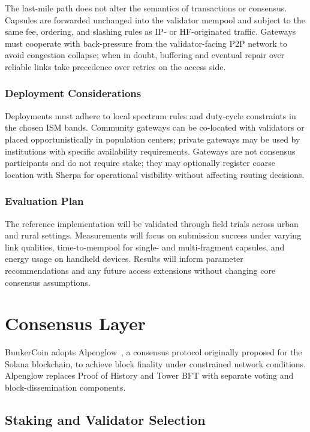 \documentclass{article}
\begin{document}
The last-mile path does not alter the semantics of transactions or consensus. Capsules are forwarded unchanged into the validator mempool and subject to the same fee, ordering, and slashing rules as IP- or HF-originated traffic. Gateways must cooperate with back-pressure from the validator-facing P2P network to avoid congestion collapse; when in doubt, buffering and eventual repair over reliable links take precedence over retries on the access side.

\subsubsection{Deployment Considerations}

Deployments must adhere to local spectrum rules and duty-cycle constraints in the chosen ISM bands. Community gateways can be co-located with validators or placed opportunistically in population centers; private gateways may be used by institutions with specific availability requirements. Gateways are not consensus participants and do not require stake; they may optionally register coarse location with Sherpa for operational visibility without affecting routing decisions.

\subsubsection{Evaluation Plan}

The reference implementation will be validated through field trials across urban and rural settings. Measurements will focus on submission success under varying link qualities, time-to-mempool for single- and multi-fragment capsules, and energy usage on handheld devices. Results will inform parameter recommendations and any future access extensions without changing core consensus assumptions.

\section{Consensus Layer}
\label{sec:consensus}

BunkerCoin adopts Alpenglow~\cite{alpenglow}, a consensus protocol originally proposed for the Solana blockchain, to achieve block finality under constrained network conditions. Alpenglow replaces Proof of History and Tower BFT with separate voting and block-dissemination components.

\subsection{Staking and Validator Selection}
\label{sec:staking}
\end{document}
